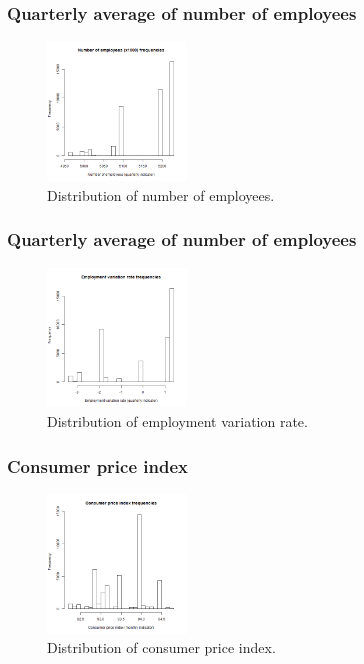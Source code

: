 \documentclass[11pt]{article}
\begin{document}
\begin{multicols}{2}
\subsubsection{Quarterly average of number of employees}
\begin{figure}[H]
	\centering
	\includegraphics[width=0.33\textwidth]{images/nr_employed}
	\caption{Distribution of number of employees.}
	\label{fig:nr_employed}
\end{figure}

\subsubsection{Quarterly average of number of employees}
\begin{figure}[H]
	\centering
	\includegraphics[width=0.33\textwidth]{images/emp_var_rate}
	\caption{Distribution of employment variation rate.}
	\label{fig:emp_var_rate}
\end{figure}

\subsubsection{Consumer price index}
\begin{figure}[H]
	\centering
	\includegraphics[width=0.33\textwidth]{images/consumer_price_index}
	\caption{Distribution of consumer price index.}
	\label{fig:cons_price_idx}
\end{figure}


\end{multicols}
\end{document}
